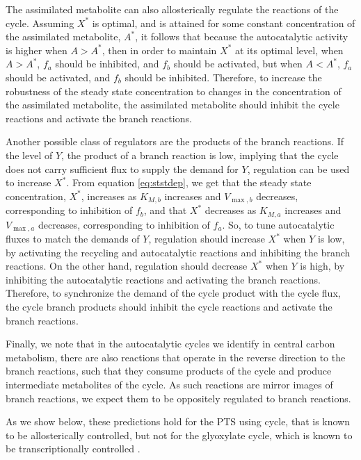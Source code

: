     The assimilated metabolite can also allosterically regulate the reactions of the cycle.
    Assuming $X^*$ is optimal, and is attained for some constant concentration of the assimilated metabolite, $A^*$, it follows that because the autocatalytic activity is higher when $A>A^*$, then in order to maintain $X^*$ at its optimal level, when $A>A^*$, $f_a$ should be inhibited, and $f_b$ should be activated, but when $A<A^*$, $f_a$ should be activated, and $f_b$ should be inhibited.
    Therefore, to increase the robustness of the steady state concentration to changes in the concentration of the assimilated metabolite, the assimilated metabolite should inhibit the cycle reactions and activate the branch reactions.

    Another possible class of regulators are the products of the branch reactions.
    If the level of $Y$, the product of a branch reaction is low, implying that the cycle does not carry sufficient flux to supply the demand for $Y$, regulation can be used to increase $X^*$. 
    From equation \ref{eq:ststdep}, we get that the steady state concentration, $X^*$, increases as $K_{M,b}$ increases and $V_{\max,b}$ decreases, corresponding to inhibition of $f_b$, and that $X^*$ decreases as $K_{M,a}$ increases and $V_{\max,a}$ decreases, corresponding to inhibition of $f_a$.
    So, to tune autocatalytic fluxes to match the demands of $Y$, regulation should increase $X^*$ when $Y$ is low, by activating the recycling and autocatalytic reactions and inhibiting the branch reactions.
    On the other hand, regulation should decrease $X^*$ when $Y$ is high, by inhibiting the autocatalytic reactions and activating the branch reactions.
    Therefore, to synchronize the demand of the cycle product with the cycle flux, the cycle branch products should inhibit the cycle reactions and activate the branch reactions.

    Finally, we note that in the autocatalytic cycles we identify in central carbon metabolism, there are also reactions that operate in the reverse direction to the branch reactions, such that they consume products of the cycle and produce intermediate metabolites of the cycle.
    As such reactions are mirror images of branch reactions, we expect them to be oppositely regulated to branch reactions.

    As we show below, these predictions hold for the PTS using cycle, that is known to be allosterically controlled, but not for the glyoxylate cycle, which is known to be transcriptionally controlled \cite{Gerosa2015-oq}.
